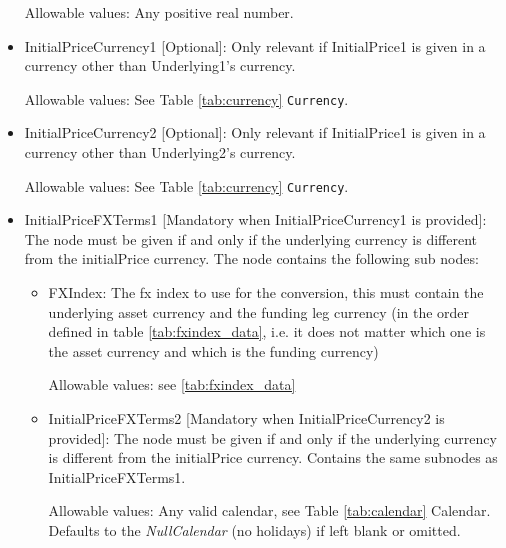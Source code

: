 \begin{itemize}
Allowable values:  Any positive real number.

\item InitialPriceCurrency1 [Optional]: Only relevant if InitialPrice1 is given in a currency other than Underlying1's currency.

Allowable values:  See Table \ref{tab:currency} \lstinline!Currency!.

\item InitialPriceCurrency2 [Optional]: Only relevant if InitialPrice1 is given in a currency other than Underlying2's currency.

Allowable values:  See Table \ref{tab:currency} \lstinline!Currency!.

\item InitialPriceFXTerms1 [Mandatory when InitialPriceCurrency1 is provided]: The node must be given if and only if the underlying currency is different from the initialPrice currency. The node contains the following sub nodes:
\begin{itemize}
  \item FXIndex: The fx index to use for the conversion, this must contain the underlying asset currency and the funding leg
    currency (in the order defined in table \ref{tab:fxindex_data}, i.e. it does not matter which one is the asset currency and which is the funding currency)
    
    Allowable values: see \ref{tab:fxindex_data}
	
\item InitialPriceFXTerms2 [Mandatory when InitialPriceCurrency2 is provided]: The node must be given if and only if the underlying currency is different from the initialPrice currency. Contains the same subnodes as InitialPriceFXTerms1.

    Allowable values: Any valid calendar, see Table \ref{tab:calendar} Calendar. Defaults to the \emph{NullCalendar} (no holidays) if left blank or omitted.
\end{itemize}
\end{itemize}
